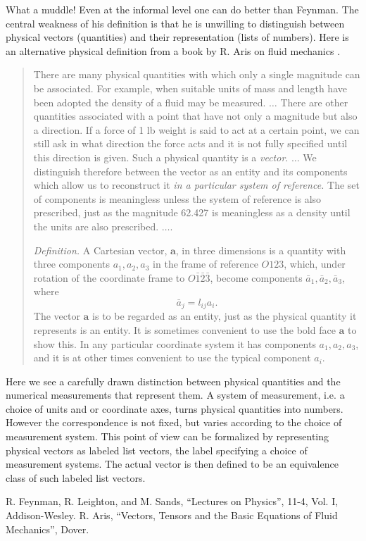 \documentclass[12pt]{article}
\begin{document}
What a muddle!  Even at the informal level one can do better than
Feynman.  The central weakness of his definition is that he is
unwilling to distinguish between physical vectors (quantities) and
their representation (lists of numbers).  Here is an alternative
physical definition from a book by R. Aris on fluid mechanics
\cite{aris}.
\begin{quote}
  There are many physical quantities with which only a single
  magnitude can be associated.  For example, when suitable units of
  mass and length have been adopted the density of a fluid may be
  measured. $\ldots$  There are other quantities associated with a
  point that have not only a magnitude but also a direction.  If a
  force of 1 lb weight is said to act at a certain point, we can still
  ask in what direction the force acts and it is not fully specified
  until this direction is given.  Such a physical quantity is a {\em
  vector}. $\ldots$  We distinguish therefore between the vector as an
  entity and its components which allow us to reconstruct it {\em in a
  particular system of reference.}  The set of components is
  meaningless unless the system of reference is also prescribed, just
  as the magnitude 62.427 is meaningless as a density until the units
  are also prescribed.
  $\ldots$.

  {\em Definition.} A Cartesian vector, $\mathbf{a}$, in three
  dimensions is a quantity with three components $a_1, a_2, a_3$ in
  the frame of reference $O123$, which, under rotation of the
  coordinate frame to $O\bar{1}\bar{2}\bar{3}$, become components
  $\bar{a}_1, \bar{a}_2, \bar{a}_3$, where 
  $$\bar{a}_j = l_{ij} a_i.$$
  The vector $\mathbf{a}$ is to be regarded as an entity, just as the
  physical quantity it represents is an entity.  It is sometimes
  convenient to use the bold face $\mathbf{a}$ to show this. In any
  particular coordinate system it has components $a_1, a_2, a_3$, and
  it is at other times convenient to use the typical component $a_i$.
\end{quote}
Here we see a carefully drawn distinction between physical quantities
and the numerical measurements that represent them.  A system of
measurement, i.e. a choice of units and or coordinate axes, turns
physical quantities into numbers. However the correspondence is not
fixed, but varies according to the choice of measurement system.  This
point of view can be formalized by representing physical vectors as
labeled list vectors, the label specifying a choice of measurement
systems.  The actual vector is then defined to be an equivalence class
of such labeled list vectors.
\begin{thebibliography}{99}
 R. Feynman, R. Leighton, and M. Sands, ``Lectures on
  Physics'', 
  11-4, Vol. I, Addison-Wesley.
 R. Aris, ``Vectors, Tensors and the Basic Equations of
  Fluid Mechanics'', Dover.
\end{thebibliography}
\end{document}
